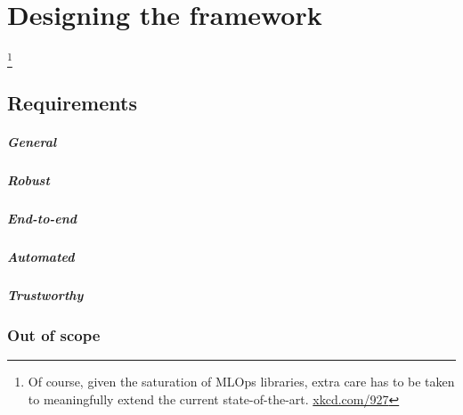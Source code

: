 \chapter{Designing the framework} \label{chapter:design}

\footnote{Of course, given the saturation of MLOps libraries, extra care has to be taken to meaningfully extend the current state-of-the-art. \href{https://xkcd.com/927/}{xkcd.com/927}}

\section{Requirements} \label{section:requirements}

\paragraph{General}
\paragraph{Robust}
\paragraph{End-to-end}
\paragraph{Automated}
\paragraph{Trustworthy}

\subsection{Out of scope}





